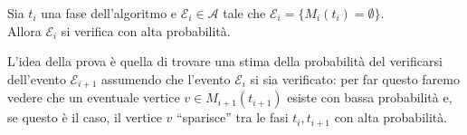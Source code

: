 \documentclass{article}
\begin{document}
\begin{lemma}
    \label{lemma:epsilon-i}
    Sia $t_i$ una fase dell'algoritmo e $\mathcal{E}_i \in \mathcal{A}$ 
    tale che $\mathcal{E}_i = \lbrace M_i(t_i) = \emptyset\rbrace$. \\
    Allora $\mathcal{E}_i$ si verifica con alta probabilit\`a.
\end{lemma}


    L'idea della prova \`e quella di trovare una stima della probabilit\`a 
    del verificarsi dell'evento $\mathcal{E}_{i+1}$ assumendo che l'evento 
    $\mathcal{E}_{i}$ si sia verificato: per far questo faremo vedere che
    un eventuale vertice $v \in M_{i+1}(t_{i+1})$ esiste con bassa
    probabilit\`a e, se questo \`e il caso, il vertice $v$ ``sparisce''
    tra le fasi $t_i, t_{i+1}$ con alta probabilit\`a.
\end{document}
